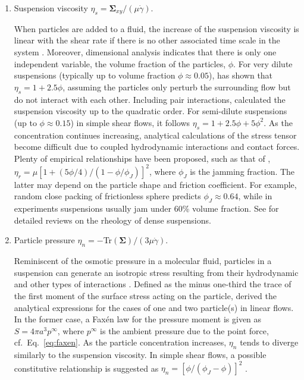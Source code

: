 \begin{enumerate}

\item Suspension viscosity $\eta_s=\bm{\Sigma}_{xy}/(\mu\dot{\gamma})$.

\medskip
When particles are added to a fluid, the increase of the suspension viscosity is linear with the shear rate if there is no other associated time scale in the system \citep{hinch_2011}.
Moreover, dimensional analysis indicates that there is only one independent variable, the volume fraction of the particles, $\phi$.
For very dilute suspensions (typically up to volume fraction $\phi \approx 0.05$), \cite{Einstein_1906, Einstein1911} has shown that $\eta_s = 1 + 2.5\phi$, assuming the particles only perturb the surrounding flow but do not interact with each other.
Including pair interactions, \cite{batchelor_green_1972b} calculated the suspension viscosity up to the quadratic order. For semi-dilute suspensions (up to $\phi \approx 0.15$) in simple shear flows, it follows $\eta_s = 1 + 2.5\phi + 5\phi^2$.
As the concentration continues increasing, analytical calculations of the stress tensor become difficult due to coupled hydrodynamic interactions and contact forces.
Plenty of empirical relationships have been proposed, such as that of \cite{Eilers1941}, $\eta_r=\mu[1+(5\phi/4)/(1-\phi/\phi_J)]^2$, where $\phi_J$ is the jamming fraction.
The latter may depend on the particle shape and friction coefficient.
For example, random close packing of frictionless sphere predicts $\phi_J \approx 0.64$, while in experiments suspensions usually jam under 60\% volume fraction.
See \cite{guazzelli_pouliquen_2018, Morris_annurev2020} for detailed reviews on the rheology of dense suspensions.
\bigskip

\item Particle pressure $\eta_n=-$Tr$(\bm{\Sigma})/(3\mu\dot{\gamma})$.

\medskip
Reminiscent of the osmotic pressure in a molecular fluid, particles in a suspension can generate an isotropic stress resulting from their hydrodynamic and other types of interactions \citep{brady--1993}.
Defined as the minus one-third the trace of the first moment of the surface stress acting on the particle, \cite{Jeffrey_morris_93} derived the analytical expressions for the cases of one and two particle(s) in linear flows. In the former case, a Fax\'{e}n law for the pressure moment is given as $S=4\pi a^3 p^\infty$, where $p^\infty$ is the ambient pressure due to the point force, cf.\ Eq.\ \eqref{eq:faxen}.
As the particle concentration increases, $\eta_n$ tends to diverge similarly to the suspension viscosity.
In simple shear flows, a possible constitutive relationship is suggested as $\eta_n=[\phi/(\phi_J-\phi)]^2$ \citep{Boyer_Guaz_Poul_2011}.
\bigskip


\end{enumerate}
